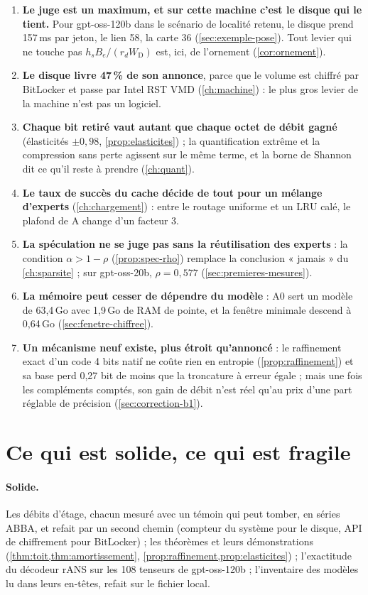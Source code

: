 \begin{enumerate}
\item \textbf{Le juge est un maximum, et sur cette machine c'est le disque qui le tient.} Pour gpt-oss-120b dans le scénario de localité retenu, le disque prend 157\,ms par jeton, le lien 58, la carte 36 (\cref{sec:exemple-pose}). Tout levier qui ne touche pas $h_s B_e/(r_d W_{\mathrm{D}})$ est, ici, de l'ornement (\cref{cor:ornement}).
\item \textbf{Le disque livre 47\,\% de son annonce}, parce que le volume est chiffré par BitLocker et passe par Intel RST VMD (\cref{ch:machine}) : le plus gros levier de la machine n'est pas un logiciel.
\item \textbf{Chaque bit retiré vaut autant que chaque octet de débit gagné} (élasticités $\pm 0{,}98$, \cref{prop:elasticites}) ; la quantification extrême et la compression sans perte agissent sur le même terme, et la borne de Shannon dit ce qu'il reste à prendre (\cref{ch:quant}).
\item \textbf{Le taux de succès du cache décide de tout pour un mélange d'experts} (\cref{ch:chargement}) : entre le routage uniforme et un LRU calé, le plafond de A change d'un facteur 3.
\item \textbf{La spéculation ne se juge pas sans la réutilisation des experts} : la condition $\alpha > 1 - \rho$ (\cref{prop:spec-rho}) remplace la conclusion « jamais » du \cref{ch:sparsite} ; sur gpt-oss-20b, $\rho = 0{,}577$ (\cref{sec:premieres-mesures}).
\item \textbf{La mémoire peut cesser de dépendre du modèle} : A0 sert un modèle de 63,4\,Go avec 1,9\,Go de RAM de pointe, et la fenêtre minimale descend à 0,64\,Go (\cref{sec:fenetre-chiffree}).
\item \textbf{Un mécanisme neuf existe, plus étroit qu'annoncé} : le raffinement exact d'un code 4 bits natif ne coûte rien en entropie (\cref{prop:raffinement}) et sa base perd 0,27 bit de moins que la troncature à erreur égale ; mais une fois les compléments comptés, son gain de débit n'est réel qu'au prix d'une part réglable de précision (\cref{sec:correction-b1}).
\end{enumerate}

\section{Ce qui est solide, ce qui est fragile}\label{sec:solide-fragile}

\paragraph{Solide.} Les débits d'étage, chacun mesuré avec un témoin qui peut tomber, en séries ABBA, et refait par un second chemin (compteur du système pour le disque, API de chiffrement pour BitLocker) ; les théorèmes et leurs démonstrations (\cref{thm:toit,thm:amortissement}, \cref{prop:raffinement,prop:elasticites}) ; l'exactitude du décodeur rANS sur les 108 tenseurs de gpt-oss-120b ; l'inventaire des modèles lu dans leurs en-têtes, refait sur le fichier local.

